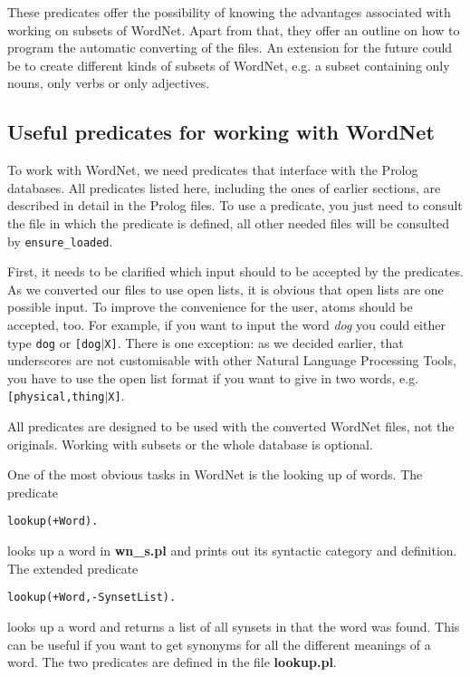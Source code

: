 \documentclass[12pt]{article}
\begin{document}
These predicates offer the possibility of knowing the advantages associated with working on subsets of WordNet.
Apart from that,
they offer an outline on how to program the automatic converting of the files. An extension for the future could be to create
different kinds of subsets of WordNet, e.g. a subset containing only nouns, only verbs or only adjectives.

\subsection{Useful predicates for working with WordNet}

To work with WordNet, we need predicates
that interface with the Prolog databases.
All predicates listed here, including the ones of earlier sections, are described in detail
in the Prolog files. To use a predicate, you just need to consult the file in which the predicate is defined, all other needed files
will be consulted by {\tt ensure\_loaded}.

First, it needs to be clarified which input should to be accepted by the predicates. As we converted our files to use open lists,
it is obvious that open lists are one possible input. To improve the convenience for the user, atoms should be accepted, too.
For example, if you want to input the word \emph{dog} you could either type {\tt dog} or {\tt [dog$|$X]}.
There is one exception: as we decided earlier, that underscores are not customisable with other Natural Language Processing Tools,
you have to use the open list format if you want to give in two words, e.g. {\tt [physical,thing$|$X]}.

All predicates are designed to be used with the converted WordNet files, not the originals. Working with subsets or the
whole database is optional.

One of the most obvious tasks in WordNet is the looking up of words. The predicate
\begin{verbatim}
lookup(+Word).
\end{verbatim}
looks up a word in {\bfseries wn\_s.pl} and prints out its syntactic category and definition. The extended predicate
\begin{verbatim}
lookup(+Word,-SynsetList).
\end{verbatim}
looks up a word and returns a list of all synsets in that the word was found. This can be useful if you want to get
synonyms for all the different meanings of a word. The two predicates are defined in the file {\bfseries lookup.pl}.
\end{document}
